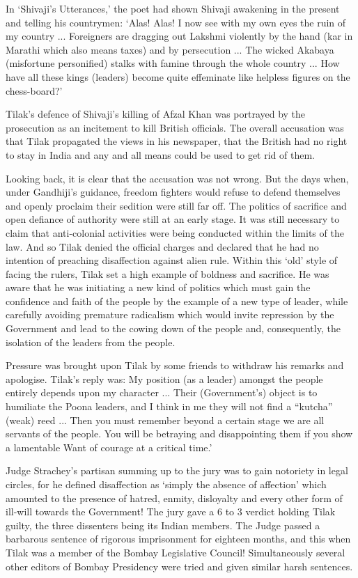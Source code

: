 In `Shivaji's Utterances,' the poet had shown Shivaji awakening in the present and telling his countrymen: `Alas! Alas! I now see with my own eyes the ruin of my country ... Foreigners are dragging out Lakshmi violently by the hand (kar in Marathi which also means taxes) and by persecution ... The wicked Akabaya (misfortune personified) stalks with famine through the whole country ... How have all these kings (leaders) become quite effeminate like helpless figures on the chess-board?'

Tilak's defence of Shivaji's killing of Afzal Khan was portrayed by the prosecution as an incitement to kill British officials. The overall accusation was that Tilak propagated the views in his newspaper, that the British had no right to stay in India and any and all means could be used to get rid of them.

Looking back, it is clear that the accusation was not wrong. But the days when, under Gandhiji's guidance, freedom fighters would refuse to defend themselves and openly proclaim their sedition were still far off. The politics of sacrifice and open defiance of authority were still at an early stage. It was still necessary to claim that anti-colonial activities were being conducted within the limits of the law. And so Tilak denied the official charges and declared that he had no intention of preaching disaffection against alien rule. Within this `old' style of facing the rulers, Tilak set a high example of boldness and sacrifice. He was aware that he was initiating a new kind of politics which must gain the confidence and faith of the people by the example of a new type of leader, while carefully avoiding premature radicalism which would invite repression by the Government and lead to the cowing down of the people and, consequently, the isolation of the leaders from the people.

Pressure was brought upon Tilak by some friends to withdraw his remarks and apologise. Tilak's reply was: My position (as a leader) amongst the people entirely depends upon my character ... Their (Government's) object is to humiliate the Poona leaders, and I think in me they will not find a ``kutcha'' (weak) reed ... Then you must remember beyond a certain stage we are all servants of the people. You will be betraying and disappointing them if you show a lamentable Want of courage at a critical time.'

Judge Strachey's partisan summing up to the jury was to gain notoriety in legal circles, for he defined disaffection as `simply the absence of affection' which amounted to the presence of hatred, enmity, disloyalty and every other form of ill-will towards the Government! The jury gave a 6 to 3 verdict holding Tilak guilty, the three dissenters being its Indian members. The Judge passed a barbarous sentence of rigorous imprisonment for eighteen months, and this when Tilak was a member of the Bombay Legislative Council! Simultaneously several other editors of Bombay Presidency were tried and given similar harsh sentences.

